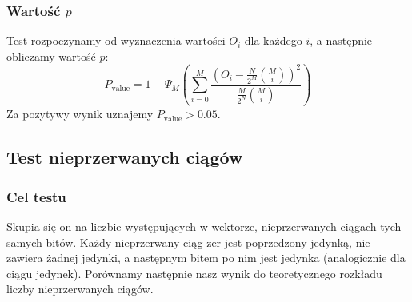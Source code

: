 \subsubsection{Wartość $p$}
Test rozpoczynamy od wyznaczenia wartości $O_i$ dla każdego $i$, a następnie obliczamy wartość $p$:
\begin{equation}
    P_{\textrm{value}} =  1 - \Psi_M\left(\sum_{i=0}^M{\frac{\left(O_i-\frac{N}{2^M}{M \choose i}\right)^2}{\frac{M}{2^N}{M \choose i}}}\right)
\end{equation}
Za pozytywy wynik uznajemy $P_{\textrm{value}} > 0.05$.
\subsection{Test nieprzerwanych ciągów}
\subsubsection{Cel testu}
Skupia się on na liczbie występujących w wektorze, nieprzerwanych ciągach tych samych bitów. Każdy nieprzerwany ciąg zer jest poprzedzony jedynką, nie zawiera żadnej jedynki, a następnym bitem po nim jest jedynka (analogicznie dla ciągu jedynek). Porównamy następnie nasz wynik do teoretycznego rozkładu liczby nieprzerwanych ciągów.
